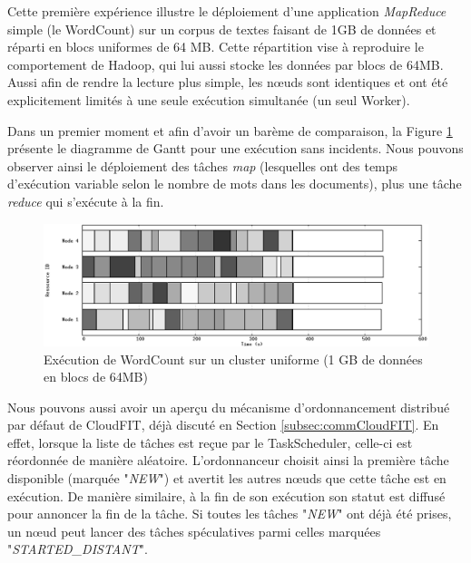 Cette première expérience illustre le déploiement d'une application \textit{MapReduce} simple (le WordCount) sur un corpus de textes faisant de 1GB de données et réparti en blocs uniformes de 64 MB. Cette répartition vise à reproduire le comportement de Hadoop, qui lui aussi stocke les données par blocs de 64MB.  Aussi afin de rendre la lecture plus simple, les n{\oe}uds sont identiques et ont été explicitement limités à une seule exécution simultanée (un seul Worker). 

Dans un premier moment et afin d'avoir un barème de comparaison, la Figure \ref{fig:regular} présente le diagramme de Gantt pour une exécution sans incidents.
Nous pouvons observer ainsi le déploiement des tâches \textit{map} (lesquelles ont des temps d'exécution variable selon le nombre de mots dans les documents), plus une tâche \textit{reduce} qui s'exécute à la fin.  

\begin{figure}
	\begin{center}
		\includegraphics[width=1\linewidth]{img/regular2}
		\caption{Exécution de WordCount sur un cluster uniforme (1 GB de données en blocs de 64MB)}\label{fig:regular}
	\end{center}
\end{figure}

Nous pouvons aussi avoir un aperçu du mécanisme d'ordonnancement distribué par défaut de CloudFIT, déjà discuté en Section \ref{subsec:commCloudFIT}. En effet, lorsque la liste de tâches est reçue par le TaskScheduler, celle-ci est réordonnée de manière aléatoire. L'ordonnanceur choisit ainsi la première tâche disponible (marquée "\textit{NEW}") et avertit les autres n{\oe}uds que cette tâche est en exécution. De manière similaire, à la fin de son exécution son statut est diffusé pour annoncer la fin de la tâche. Si toutes les tâches "\textit{NEW}" ont déjà été prises, un n{\oe}ud peut lancer des tâches spéculatives parmi celles marquées "\textit{STARTED\_DISTANT}". 

